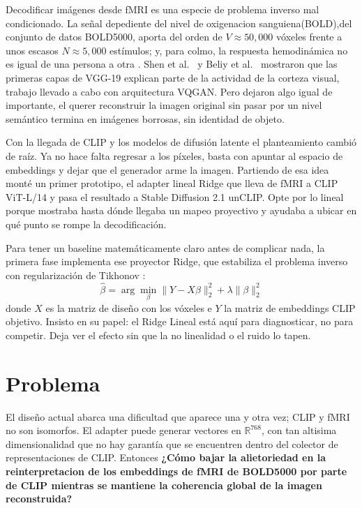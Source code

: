 Decodificar imágenes desde fMRI es una especie de problema inverso mal 
condicionado. La señal depediente del nivel de oxigenacion sanguiena(BOLD),del conjunto 
de datos BOLD5000, aporta del orden de $V \approx 50{,}000$ vóxeles frente a unos 
escasos $N \approx 5{,}000$ estímulos; y, para colmo, la respuesta hemodinámica no es 
igual de una persona a otra \cite{logothetis2008what}. Shen et al.~\cite{shen2019deep} 
y Beliy et al.~\cite{beliy2019voxels} mostraron que las primeras capas de VGG-19 
explican parte de la actividad de la corteza visual, trabajo llevado a cabo con arquitectura VQGAN. 
Pero dejaron algo igual de importante, el querer reconstruir la imagen original sin 
pasar por un nivel semántico termina en imágenes borrosas, sin identidad de objeto.

Con la llegada de CLIP \cite{radford2021learning} y los modelos de difusión latente 
\cite{rombach2022high} el planteamiento cambió de raíz. Ya no hace falta regresar a los
píxeles, basta con apuntar al espacio de embeddings y dejar que el generador arme la 
imagen. Partiendo de esa idea monté un primer prototipo, el adapter lineal Ridge que 
lleva de fMRI a CLIP ViT-L/14 y pasa el resultado a Stable Diffusion 2.1 unCLIP. 
Opte por lo lineal porque mostraba hasta dónde llegaba un mapeo proyectivo y ayudaba a 
ubicar en qué punto se rompe la decodificación.

Para tener un baseline matemáticamente claro antes de complicar nada, la primera fase 
implementa ese proyector Ridge, que estabiliza el problema inverso con regularización 
de Tikhonov \cite{tikhonov1977solutions}:
\begin{equation}
\hat{\beta} = \arg\min_{\beta} \| Y - X\beta \|_2^2 + \lambda \|\beta\|_2^2
\end{equation}
donde $X$ es la matriz de diseño con los vóxeles e $Y$ la matriz de embeddings CLIP 
objetivo. Insisto en su papel: el Ridge Lineal está aquí para diagnosticar, no para 
competir. Deja ver el efecto sin que la no linealidad o el ruido lo tapen.

\section{Problema}

El diseño actual abarca una dificultad que aparece una y otra vez; CLIP y fMRI no son 
isomorfos. El adapter puede generar vectores en $\mathbb{R}^{768}$, con tan altisima 
dimensionalidad que no hay garantía que se encuentren dentro del colector de 
representaciones de  CLIP. Entonces \textbf{¿Cómo bajar la alietoriedad en la 
reinterpretacion de los embeddings de fMRI de BOLD5000 por parte de CLIP mientras se mantiene la 
coherencia global de la imagen reconstruida?}

